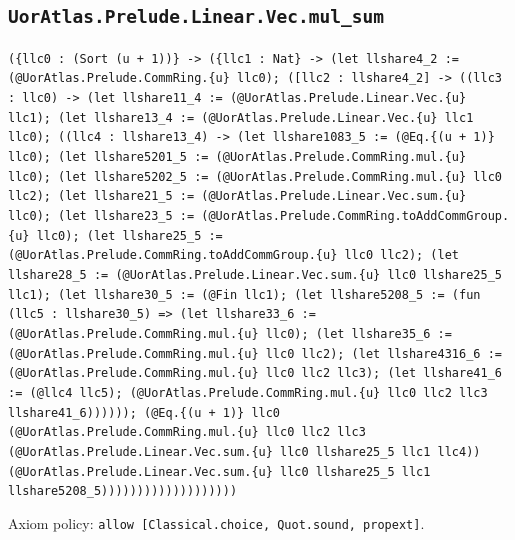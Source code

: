 \documentclass[11pt]{article}
\begin{document}
\subsection*{\texttt{UorAtlas.Prelude.Linear.Vec.mul\_sum}}
\noindent\texttt{(\{llc0 : (Sort (u + 1))\} -> (\{llc1 : Nat\} -> (let llshare4\_2 := (@UorAtlas.Prelude.CommRing.\{u\} llc0); ([llc2 : llshare4\_2] -> ((llc3 : llc0) -> (let llshare11\_4 := (@UorAtlas.Prelude.Linear.Vec.\{u\} llc1); (let llshare13\_4 := (@UorAtlas.Prelude.Linear.Vec.\{u\} llc1 llc0); ((llc4 : llshare13\_4) -> (let llshare1083\_5 := (@Eq.\{(u + 1)\} llc0); (let llshare5201\_5 := (@UorAtlas.Prelude.CommRing.mul.\{u\} llc0); (let llshare5202\_5 := (@UorAtlas.Prelude.CommRing.mul.\{u\} llc0 llc2); (let llshare21\_5 := (@UorAtlas.Prelude.Linear.Vec.sum.\{u\} llc0); (let llshare23\_5 := (@UorAtlas.Prelude.CommRing.toAddCommGroup.\{u\} llc0); (let llshare25\_5 := (@UorAtlas.Prelude.CommRing.toAddCommGroup.\{u\} llc0 llc2); (let llshare28\_5 := (@UorAtlas.Prelude.Linear.Vec.sum.\{u\} llc0 llshare25\_5 llc1); (let llshare30\_5 := (@Fin llc1); (let llshare5208\_5 := (fun (llc5 : llshare30\_5) => (let llshare33\_6 := (@UorAtlas.Prelude.CommRing.mul.\{u\} llc0); (let llshare35\_6 := (@UorAtlas.Prelude.CommRing.mul.\{u\} llc0 llc2); (let llshare4316\_6 := (@UorAtlas.Prelude.CommRing.mul.\{u\} llc0 llc2 llc3); (let llshare41\_6 := (@llc4 llc5); (@UorAtlas.Prelude.CommRing.mul.\{u\} llc0 llc2 llc3 llshare41\_6)))))); (@Eq.\{(u + 1)\} llc0 (@UorAtlas.Prelude.CommRing.mul.\{u\} llc0 llc2 llc3 (@UorAtlas.Prelude.Linear.Vec.sum.\{u\} llc0 llshare25\_5 llc1 llc4)) (@UorAtlas.Prelude.Linear.Vec.sum.\{u\} llc0 llshare25\_5 llc1 llshare5208\_5)))))))))))))))))))}\par
\noindent Axiom policy: \texttt{allow [Classical.choice, Quot.sound, propext]}.\par
\end{document}

